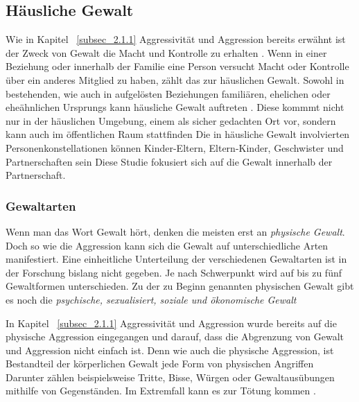 \subsection{Häusliche Gewalt}    \label{subsec_2.1.2}
Wie in Kapitel ~\ref{subsec_2.1.1} Aggressivität und Aggression bereits erwähnt ist der Zweck von 
Gewalt die Macht und Kontrolle zu erhalten \parencite{Def_Aggressivität_vs_violence}.
Wenn in einer Beziehung oder innerhalb der Familie eine Person versucht Macht oder Kontrolle
über ein anderes Mitglied zu haben, zählt das zur häuslichen Gewalt. Sowohl in bestehenden, wie 
auch in aufgelösten Beziehungen familiären, ehelichen oder eheähnlichen Ursprungs kann häusliche
Gewalt auftreten \parencite{Def_haus_Gewalt, Def_haus_Gewalt_2}.
Diese kommmt nicht nur in der häuslichen Umgebung, einem als sicher gedachten Ort vor, sondern 
kann auch im öffentlichen Raum stattfinden \parencite{Gewaltarten_WHO}
Die in häusliche Gewalt involvierten Personenkonstellationen können Kinder-Eltern, Eltern-Kinder,
Geschwister und Partnerschaften sein \parencite{Def_Form_Folge_Gewalt}
Diese Studie fokusiert sich auf die Gewalt innerhalb der Partnerschaft.

\subsubsection{Gewaltarten}     \label{2.1.2.1}
Wenn man das Wort Gewalt hört, denken die meisten erst an \textit{physische Gewalt}. Doch so wie die 
Aggression kann sich die Gewalt auf unterschiedliche Arten manifestiert. Eine einheitliche 
Unterteilung der verschiedenen Gewaltarten ist in der Forschung bislang nicht gegeben. Je nach 
Schwerpunkt wird auf bis zu fünf Gewaltformen unterschieden. Zu der zu Beginn genannten physischen 
Gewalt gibt es noch die \textit{psychische, sexualisiert, soziale und ökonomische Gewalt} \parencite{Def_Form_Folge_Gewalt}

In Kapitel ~\ref{subsec_2.1.1} Aggressivität und Aggression wurde bereits auf die physische 
Aggression eingegangen und darauf, dass die Abgrenzung von Gewalt und Aggression nicht einfach ist. 
Denn wie auch die physische Aggression, ist Bestandteil der körperlichen Gewalt jede Form von 
physischen Angriffen \parencite{ph_G_wie_aggro}
Darunter zählen beispielsweise Tritte, Bisse, Würgen oder Gewaltausübungen mithilfe von Gegenständen.
Im Extremfall kann es zur Tötung kommen \parencite{Gewaltart, Def_haus_Gewalt, physische_Gewalt_wie_aggro, Def_Form_Folge_Gewalt}.

